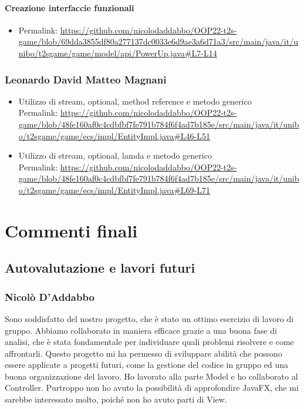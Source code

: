 \documentclass[a4paper,12pt]{report}
\begin{document}
\subsubsection*{Creazione interfaccie funzionali}
\begin{itemize}
    \item Permalink: \url{https://github.com/nicolodaddabbo/OOP22-t2s-game/blob/69dda3855df80a277137dc0033e6d9ae3a6d71a3/src/main/java/it/unibo/t2sgame/game/model/api/PowerUp.java#L7-L14}
\end{itemize}

\subsection*{Leonardo David Matteo Magnani}
\begin{itemize}
	\item Utilizzo di stream, optional, method reference e metodo generico  \\
	Permalink: \url{https://github.com/nicolodaddabbo/OOP22-t2s-game/blob/48fe160af0c4cdbfbf7fe791b784f6f4ad7b185e/src/main/java/it/unibo/t2sgame/game/ecs/impl/EntityImpl.java#L46-L51}
	\item Utilizzo di stream, optional, lamda e metodo generico \\
	Permalink: \url{https://github.com/nicolodaddabbo/OOP22-t2s-game/blob/48fe160af0c4cdbfbf7fe791b784f6f4ad7b185e/src/main/java/it/unibo/t2sgame/game/ecs/impl/EntityImpl.java#L69-L71}
\end{itemize}

\chapter{Commenti finali}

\section{Autovalutazione e lavori futuri}
\subsection*{Nicolò D'Addabbo}
Sono soddisfatto del nostro progetto, che è stato un ottimo esercizio di lavoro di gruppo. Abbiamo collaborato in maniera efficace grazie a una buona fase di analisi, che è stata fondamentale per individuare quali problemi risolvere e come affrontarli. Questo progetto mi ha permesso di sviluppare abilità che possono essere applicate a progetti futuri, come la gestione del codice in gruppo ed una buona organizzazione del lavoro.
Ho lavorato alla parte Model e ho collaborato al Controller. Purtroppo non ho avuto la possibilità di approfondire JavaFX, che mi sarebbe interessato molto, poiché non ho avuto parti di View.
\end{document}
